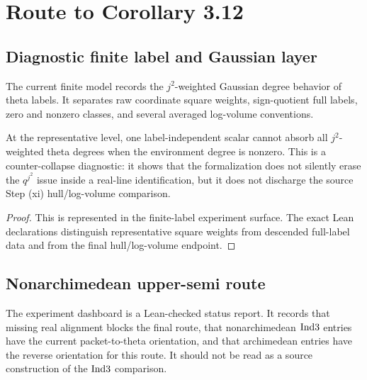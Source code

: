\chapter{Route to Corollary 3.12}
\label{ch:corollary-route}

\section{Diagnostic finite label and Gaussian layer}

\begin{definition}
  \label{def:finite-label-profile}
  \leanok
  The current finite model records the \(j^2\)-weighted Gaussian degree
  behavior of theta labels.  It separates raw coordinate square weights,
  sign-quotient full labels, zero and nonzero classes, and several averaged
  log-volume conventions.
\end{definition}

\begin{proposition}
  \label{prop:no-silent-scalar-absorption}
  \leanok
  At the representative level, one label-independent scalar cannot absorb all
  \(j^2\)-weighted theta degrees when the environment degree is nonzero.  This
  is a counter-collapse diagnostic: it shows that the formalization does not
  silently erase the \(q^{j^2}\) issue inside a real-line identification, but
  it does not discharge the source Step (xi) hull/log-volume comparison.
\end{proposition}

\begin{proof}
  This is represented in the finite-label experiment surface.  The exact Lean
  declarations distinguish representative square weights from descended
  full-label data and from the final hull/log-volume endpoint.
\end{proof}

\section{Nonarchimedean upper-semi route}

\begin{definition}
  \label{def:ind3-local-orientation}
  \leanok
  The experiment dashboard is a Lean-checked status report.  It records that
  missing real alignment blocks the final route, that nonarchimedean
  \(\mathrm{Ind3}\) entries have the current packet-to-theta orientation, and that
  archimedean entries have the reverse orientation for this route.  It should
  not be read as a source construction of the \(\mathrm{Ind3}\) comparison.
\end{definition}

